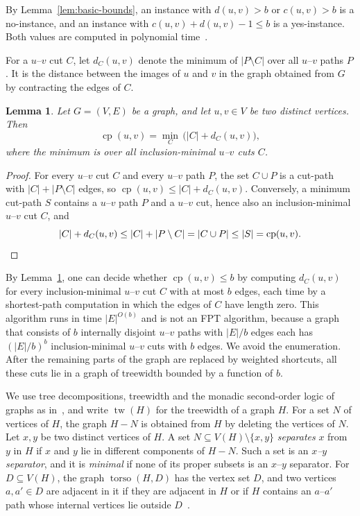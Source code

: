 \documentclass[a4paper,fleqn]{cas-sc}
\numberwithin{equation}{section}
\theoremstyle{definition}
\theoremstyle{plain}
\newtheorem{lemma}[definition]{Lemma}
\theoremstyle{remark}
\newcommand{\cp}{\operatorname{cp}}                  %
\newcommand{\tw}{\operatorname{tw}}
\newcommand{\torso}{\operatorname{torso}}
\begin{document}
By Lemma~\ref{lem:basic-bounds}, an instance with $d(u,v) > b$ or $c(u,v) > b$ is a no-instance, and an instance with $c(u,v) + d(u,v) - 1 \leq b$ is a yes-instance.
Both values are computed in polynomial time~\cite{Cormen2022}.

For a $u$--$v$ cut $C$, let $d_C(u,v)$ denote the minimum of $|P \setminus C|$ over all $u$--$v$ paths $P$.
It is the distance between the images of $u$ and $v$ in the graph obtained from $G$ by contracting the edges of $C$.

\begin{lemma}
\label{lem:contraction}
Let $G = (V, E)$ be a graph, and let $u, v \in V$ be two distinct vertices. Then
\[
\cp(u,v) = \min_{C}\, \bigl(|C| + d_C(u,v)\bigr),
\]
where the minimum is over all inclusion-minimal $u$--$v$ cuts $C$.
\end{lemma}

\begin{proof}
For every $u$--$v$ cut $C$ and every $u$--$v$ path $P$, the set $C \cup P$ is a cut-path with $|C| + |P \setminus C|$ edges, so $\cp(u,v) \leq |C| + d_C(u,v)$.
Conversely, a minimum cut-path $S$ contains a $u$--$v$ path $P$ and a $u$--$v$ cut, hence also an inclusion-minimal $u$--$v$ cut $C$, and
\[
|C| + d_C(u,v) \leq |C| + |P \setminus C| = |C \cup P| \leq |S| = \cp(u,v). \qedhere
\]
\end{proof}

By Lemma~\ref{lem:contraction}, one can decide whether $\cp(u,v) \leq b$ by computing $d_C(u,v)$ for every inclusion-minimal $u$--$v$ cut $C$ with at most $b$ edges, each time by a shortest-path computation in which the edges of $C$ have length zero.
This algorithm runs in time $|E|^{O(b)}$ and is not an FPT algorithm, because a graph that consists of $b$ internally disjoint $u$--$v$ paths with $|E|/b$ edges each has $(|E|/b)^b$ inclusion-minimal $u$--$v$ cuts with $b$ edges.
We avoid the enumeration.
After the remaining parts of the graph are replaced by weighted shortcuts, all these cuts lie in a graph of treewidth bounded by a function of $b$.

We use tree decompositions, treewidth and the monadic second-order logic of graphs as in~\cite[Section~2.1]{Marx2013Separators}, and write $\tw(H)$ for the treewidth of a graph $H$.
For a set $N$ of vertices of $H$, the graph $H - N$ is obtained from $H$ by deleting the vertices of $N$.
Let $x, y$ be two distinct vertices of $H$.
A set $N \subseteq V(H) \setminus \{x, y\}$ \emph{separates} $x$ from $y$ in $H$ if $x$ and $y$ lie in different components of $H - N$.
Such a set is an \emph{$x$--$y$ separator}, and it is \emph{minimal} if none of its proper subsets is an $x$--$y$ separator.
For $D \subseteq V(H)$, the graph $\torso(H, D)$ has the vertex set $D$, and two vertices $a, a' \in D$ are adjacent in it if they are adjacent in $H$ or if $H$ contains an $a$--$a'$ path whose internal vertices lie outside $D$~\cite[Definition~2.5]{Marx2013Separators}.
\end{document}
